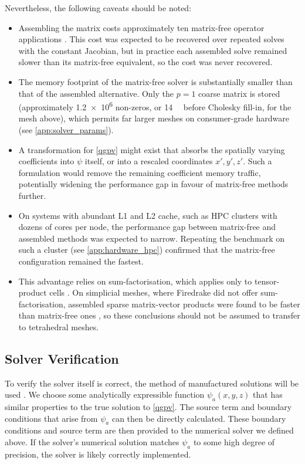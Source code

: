 \documentclass{article}
\begin{document}
Nevertheless, the following caveats should be noted:
\begin{itemize}
    \item
    Assembling the matrix costs approximately ten matrix-free operator applications \cite{KirbyMitchell2018}.
    This cost was expected to be recovered over repeated solves with the constant Jacobian, but in practice each assembled solve remained slower than its matrix-free equivalent, so the cost was never recovered.

    \item
    The memory footprint of the matrix-free solver is substantially smaller than that of the assembled alternative.
    Only the $p=1$ coarse matrix is stored (approximately \num{1.2e6} non-zeros, or \qty{14}{\mega\byte} before Cholesky fill-in, for the mesh above), which permits far larger meshes on consumer-grade hardware (see \cref{app:solver_params}).

    \item
    A transformation for \cref{qgpv} might exist that absorbs the spatially varying coefficients into $\psi$ itself, or into a rescaled coordinates $x',y',z'$.
    Such a formulation would remove the remaining coefficient memory traffic, potentially widening the performance gap in favour of matrix-free methods further.

    \item
    On systems with abundant L1 and L2 cache, such as HPC clusters with dozens of cores per node, the performance gap between matrix-free and assembled methods was expected to narrow.
    Repeating the benchmark on such a cluster (see \cref{app:hardware_hpc}) confirmed that the matrix-free configuration remained the fastest.

    \item
    This advantage relies on sum-factorisation, which applies only to tensor-product cells \cite{Homolya2017}.
    On simplicial meshes, where Firedrake did not offer sum-factorisation, assembled sparse matrix-vector products were found to be faster than matrix-free ones \cite{KirbyMitchell2018}, so these conclusions should not be assumed to transfer to tetrahedral meshes.
\end{itemize}

\subsection{Solver Verification}\label{sec:mms}

To verify the solver itself is correct, the method of manufactured solutions will be used \cite{Roache2002}.
We choose some analytically expressible function $\psi_a(x,y,z)$ that has similar properties to the true solution to \cref{qgpv}.
The source term and boundary conditions that arise from $\psi_a$ can then be directly calculated.
These boundary conditions and source term are then provided to the numerical solver we defined above.
If the solver's numerical solution matches $\psi_a$ to some high degree of precision, the solver is likely correctly implemented.
\end{document}
